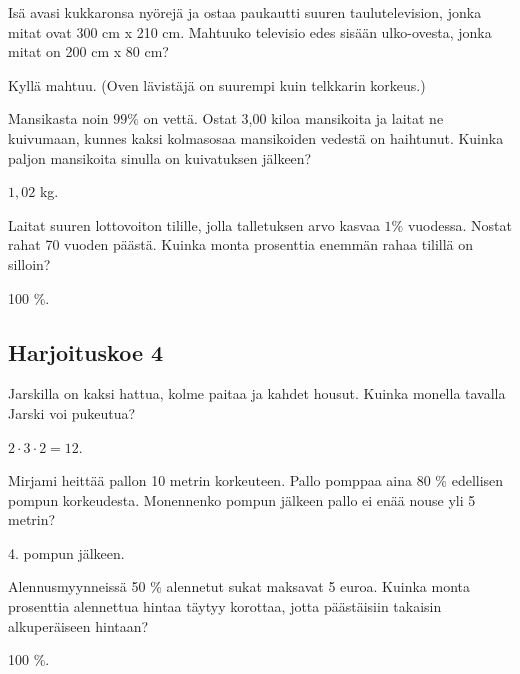 	\begin{tehtava}
Isä avasi kukkaronsa nyörejä ja ostaa paukautti suuren taulutelevision, jonka mitat ovat 300 cm x 210 cm. Mahtuuko televisio edes sisään ulko-ovesta, jonka mitat on 200 cm x 80 cm?
	\begin{vastaus}
	 Kyllä mahtuu. (Oven lävistäjä on suurempi kuin telkkarin korkeus.)
	\end{vastaus}
	\end{tehtava}
	
	\begin{tehtava}
Mansikasta noin $99 \%$ on vettä. Ostat 3,00 kiloa mansikoita ja laitat ne kuivumaan, kunnes kaksi kolmasosaa mansikoiden vedestä on haihtunut. Kuinka paljon mansikoita sinulla on kuivatuksen jälkeen?
	\begin{vastaus}
	 $1,02$ kg.
	\end{vastaus}
	\end{tehtava}
	
	\begin{tehtava}
Laitat suuren lottovoiton tilille, jolla talletuksen arvo kasvaa $1 \%$ vuodessa. Nostat rahat 70 vuoden päästä. Kuinka monta prosenttia enemmän rahaa tilillä on silloin?
	\begin{vastaus}
	 100 \%.
	\end{vastaus}
	\end{tehtava}
	
\subsection*{Harjoituskoe 4}
	
	\begin{tehtava}
Jarskilla on kaksi hattua, kolme paitaa ja kahdet housut. Kuinka monella tavalla Jarski voi pukeutua?
	 \begin{vastaus}
	  $2 \cdot 3 \cdot 2 = 12$.
	 \end{vastaus}
	 \end{tehtava}
	 
	\begin{tehtava}
Mirjami heittää pallon 10 metrin korkeuteen. Pallo pomppaa aina 80 \% edellisen pompun korkeudesta. Monennenko pompun jälkeen pallo ei enää nouse yli 5 metrin?
	\begin{vastaus}
	 4. pompun jälkeen.
	\end{vastaus}
	\end{tehtava}
	
	\begin{tehtava}
Alennusmyynneissä 50 \% alennetut sukat maksavat 5 euroa. Kuinka monta prosenttia alennettua hintaa täytyy korottaa, jotta päästäisiin takaisin alkuperäiseen hintaan?
	\begin{vastaus}
	 100 \%.
	\end{vastaus}
	\end{tehtava}
	
